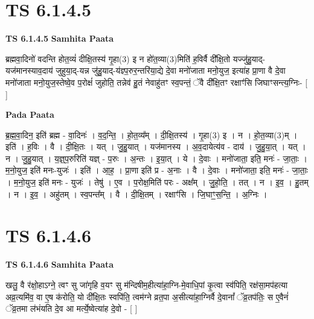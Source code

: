 \documentclass[17pt]{extarticle}
\begin{document}
\section{ TS 6.1.4.5 }

\textbf{TS 6.1.4.5 } \newline
\textbf{Samhita Paata} \newline

ब्रह्मवा॒दिनो॑ वदन्ति होत॒व्यं॑ दीक्षि॒तस्य॑ गृ॒हा(3) इ न हो॑त॒व्या(3)मिति॑ ह॒विर्वै दी᳚क्षि॒तो यज्जु॑हु॒याद्-यज॑मानस्याव॒दाय॑ जुहुया॒द्-यन्न जु॑हु॒याद्-य॑ज्ञ्प॒रुर॒न्तरि॑या॒द्ये दे॒वा मनो॑जाता मनो॒युज॒ इत्या॑ह प्रा॒णा वै दे॒वा मनो॑जाता मनो॒युज॒स्तेष्वे॒व प॒रोक्षं॑ जुहोति॒ तन्नेव॑ हु॒तं नेवाहु॑तꣳ स्व॒पन्तं॒ ॅवै दी᳚क्षि॒तꣳ रक्षाꣳ॑सि जिघाꣳसन्त्य॒ग्निः- [  ] \newline

\textbf{Pada Paata} \newline

ब्र॒ह्म॒वा॒दिन॒ इति॑ ब्रह्म - वा॒दिनः॑ । व॒द॒न्ति॒ । हो॒त॒व्य᳚म् । दी॒क्षि॒तस्य॑ । गृ॒हा(3) इ । न । हो॒त॒व्या(3)म् । इति॑ । ह॒विः । वै । दी॒क्षि॒तः । यत् । जु॒हु॒यात् । यज॑मानस्य । अ॒व॒दायेत्य॑व - दाय॑ । जु॒हु॒या॒त् । यत् । न । जु॒हु॒यात् । य॒ज्ञ्॒प॒रुरिति॑ यज्ञ् - प॒रुः । अ॒न्तः । इ॒या॒त् । ये । दे॒वाः । मनो॑जाता॒ इति॒ मनः॑ - जा॒ताः॒ । म॒नो॒युज॒ इति॑ मनः-युजः॑ । इति॑ । आ॒ह॒ । प्रा॒णा इति॑ प्र - अ॒नाः । वै । दे॒वाः । मनो॑जाता॒ इति॒ मनः॑ - जा॒ताः॒ । म॒नो॒युज॒ इति॑ मनः - युजः॑ । तेषु॑ । ए॒व । प॒रोक्ष॒मिति॑ परः - अक्ष᳚म् । जु॒हो॒ति॒ । तत् । न । इ॒व॒ । हु॒तम् । न । इ॒व॒ । अहु॑तम् । स्व॒पन्त᳚म् । वै । दी॒क्षि॒तम् । रक्षाꣳ॑सि । जि॒घाꣳ॒॒स॒न्ति॒ । अ॒ग्निः ।  \newline





\section{ TS 6.1.4.6 }

\textbf{TS 6.1.4.6 } \newline
\textbf{Samhita Paata} \newline

खलु॒ वै र॑क्षो॒हाऽग्ने॒ त्वꣳ सु जा॑गृहि व॒यꣳ सु म॑न्दिषीम॒हीत्या॑हा॒ग्नि-मे॒वाधि॒पां कृ॒त्वा स्व॑पिति॒ रक्ष॑सा॒मप॑हत्या अव्र॒त्यमि॑व॒ वा ए॒ष क॑रोति॒ यो दी᳚क्षि॒तः स्वपि॑ति॒ त्वम॑ग्ने व्रत॒पा अ॒सीत्या॑हा॒ग्निर्वै दे॒वानां᳚ ॅव्र॒तप॑तिः॒ स ए॒वैनं॑ ॅव्र॒तमा ल॑भंयति दे॒व आ मर्त्ये॒ष्वेत्या॑ह दे॒वो - [  ] \newline
\end{document}
